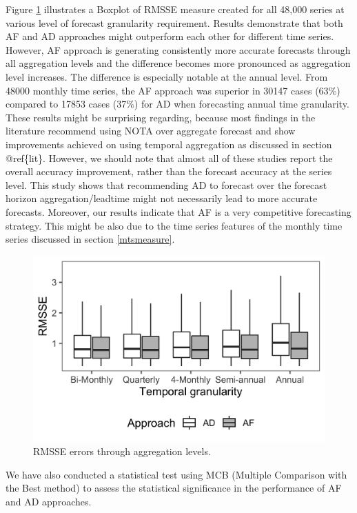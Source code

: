 \documentclass[preprint, 3p,
authoryear]{elsarticle} %
\begin{document}
Figure \ref{fig:RMSSE} illustrates a Boxplot of RMSSE measure created
for all 48,000 series at various level of forecast granularity
requirement. Results demonstrate that both AF and AD approaches might
outperform each other for different time series. However, AF approach is
generating consistently more accurate forecasts through all aggregation
levels and the difference becomes more pronounced as aggregation level
increases. The difference is especially notable at the annual level.
From 48000 monthly time series, the AF approach was superior in 30147
cases (63\%) compared to 17853 cases (37\%) for AD when forecasting
annual time granularity. These results might be surprising regarding,
because most findings in the literature recommend using NOTA over
aggregate forecast and show improvements achieved on using temporal
aggregation as discussed in section @ref\{lit\}. However, we should note
that almost all of these studies report the overall accuracy
improvement, rather than the forecast accuracy at the series level. This
study shows that recommending AD to forecast over the forecast horizon
aggregation/leadtime might not necessarily lead to more accurate
forecasts. Moreover, our results indicate that AF is a very competitive
forecasting strategy. This might be also due to the time series features
of the monthly time series discussed in section \ref{mtsmeasure}.

\begin{figure}[H]

{\centering \includegraphics[width=0.7\linewidth]{img/300dpi/box_plot_rmsse} 

}

\caption{RMSSE errors through aggregation levels.}\label{fig:RMSSE}
\end{figure}

We have also conducted a statistical test using MCB (Multiple Comparison
with the Best method) \citep{MCB} to assess the statistical significance
in the performance of AF and AD approaches.
\end{document}
